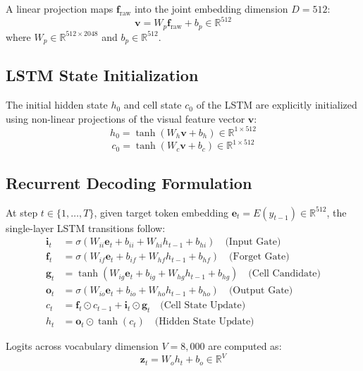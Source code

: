 \documentclass[11pt,a4paper]{article}
\begin{document}
A linear projection maps $\mathbf{f}_{\text{raw}}$ into the joint embedding dimension $D = 512$:
\begin{equation}
\mathbf{v} = W_p \mathbf{f}_{\text{raw}} + b_p \in \mathbb{R}^{512}
\end{equation}
where $W_p \in \mathbb{R}^{512 \times 2048}$ and $b_p \in \mathbb{R}^{512}$.

\subsection{LSTM State Initialization}
The initial hidden state $h_0$ and cell state $c_0$ of the LSTM are explicitly initialized using non-linear projections of the visual feature vector $\mathbf{v}$:
\begin{equation}
h_0 = \tanh(W_h \mathbf{v} + b_h) \in \mathbb{R}^{1 \times 512}
\end{equation}
\begin{equation}
c_0 = \tanh(W_c \mathbf{v} + b_c) \in \mathbb{R}^{1 \times 512}
\end{equation}

\subsection{Recurrent Decoding Formulation}
At step $t \in \{1, \dots, T\}$, given target token embedding $\mathbf{e}_t = E(y_{t-1}) \in \mathbb{R}^{512}$, the single-layer LSTM transitions follow:
\begin{align}
\mathbf{i}_t &= \sigma(W_{ii} \mathbf{e}_t + b_{ii} + W_{hi} h_{t-1} + b_{hi}) \quad \text{(Input Gate)} \\
\mathbf{f}_t &= \sigma(W_{if} \mathbf{e}_t + b_{if} + W_{hf} h_{t-1} + b_{hf}) \quad \text{(Forget Gate)} \\
\mathbf{g}_t &= \tanh(W_{ig} \mathbf{e}_t + b_{ig} + W_{hg} h_{t-1} + b_{hg}) \quad \text{(Cell Candidate)} \\
\mathbf{o}_t &= \sigma(W_{io} \mathbf{e}_t + b_{io} + W_{ho} h_{t-1} + b_{ho}) \quad \text{(Output Gate)} \\
c_t &= \mathbf{f}_t \odot c_{t-1} + \mathbf{i}_t \odot \mathbf{g}_t \quad \text{(Cell State Update)} \\
h_t &= \mathbf{o}_t \odot \tanh(c_t) \quad \text{(Hidden State Update)}
\end{align}

Logits across vocabulary dimension $V = 8,000$ are computed as:
\begin{equation}
\mathbf{z}_t = W_o h_t + b_o \in \mathbb{R}^{V}
\end{equation}
\end{document}
